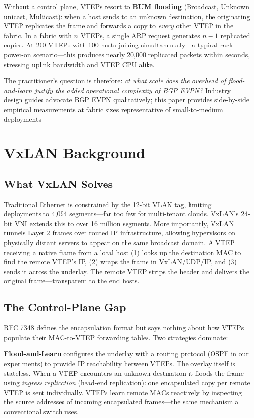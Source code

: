 \documentclass[10pt,twocolumn]{article}
\begin{document}
Without a control plane, VTEPs resort to \textbf{BUM flooding} (Broadcast,
Unknown unicast, Multicast): when a host sends to an unknown destination, the
originating VTEP replicates the frame and forwards a copy to \emph{every}
other VTEP in the fabric.  In a fabric with $n$ VTEPs, a single ARP request
generates $n-1$ replicated copies.  At 200 VTEPs with 100 hosts joining
simultaneously---a typical rack power-on scenario---this produces nearly
20,000 replicated packets within seconds, stressing uplink bandwidth and VTEP
CPU alike.

The practitioner's question is therefore: \emph{at what scale does the
overhead of flood-and-learn justify the added operational complexity of BGP
EVPN?}  Industry design guides advocate BGP EVPN qualitatively; this paper
provides side-by-side empirical measurements at fabric sizes representative of
small-to-medium deployments.

\section{VxLAN Background}

\subsection{What VxLAN Solves}

Traditional Ethernet is constrained by the 12-bit VLAN tag, limiting
deployments to 4,094 segments---far too few for multi-tenant clouds.  VxLAN's
24-bit VNI extends this to over 16 million segments.  More importantly, VxLAN
tunnels Layer 2 frames over routed IP infrastructure, allowing hypervisors on
physically distant servers to appear on the same broadcast domain.  A VTEP
receiving a native frame from a local host (1) looks up the destination MAC to
find the remote VTEP's IP, (2) wraps the frame in VxLAN/UDP/IP, and (3) sends
it across the underlay.  The remote VTEP strips the header and delivers the
original frame---transparent to the end hosts.

\subsection{The Control-Plane Gap}

RFC 7348 defines the encapsulation format but says nothing about how VTEPs
populate their MAC-to-VTEP forwarding tables.  Two strategies dominate:

\textbf{Flood-and-Learn} configures the underlay with a routing protocol (OSPF
in our experiments) to provide IP reachability between VTEPs.  The overlay
itself is stateless.  When a VTEP encounters an unknown destination it floods
the frame using \emph{ingress replication} (head-end replication): one
encapsulated copy per remote VTEP is sent individually.  VTEPs learn remote
MACs reactively by inspecting the source addresses of incoming encapsulated
frames---the same mechanism a conventional switch uses.
\end{document}
